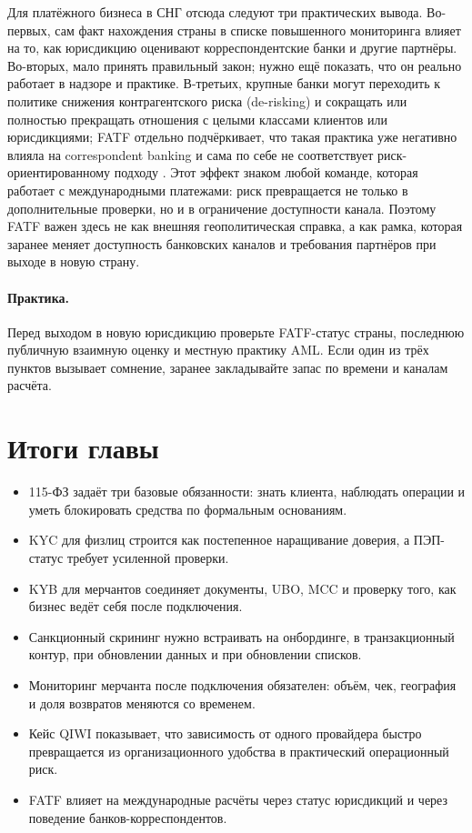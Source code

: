 Для платёжного бизнеса в СНГ отсюда следуют три практических вывода.
Во-первых, сам факт нахождения страны в списке повышенного
мониторинга влияет на то, как юрисдикцию оценивают корреспондентские
банки и другие партнёры. Во-вторых, мало принять правильный закон;
нужно ещё показать, что он реально работает в надзоре и практике.
В-третьих, крупные банки могут переходить к политике снижения
контрагентского риска (de-risking) и сокращать или полностью
прекращать отношения с целыми классами клиентов или юрисдикциями;
FATF отдельно подчёркивает, что такая практика уже негативно
влияла на correspondent banking и сама по себе не соответствует
риск-ориентированному подходу
\cite{fatf-correspondent-banking}\cite{fatf-increased-monitoring}.
Этот эффект знаком любой команде, которая работает с международными
платежами: риск превращается не только в дополнительные проверки,
но и в ограничение доступности канала. Поэтому FATF важен здесь не
как внешняя геополитическая справка, а как рамка, которая заранее
меняет доступность банковских каналов и требования партнёров при
выходе в новую страну.

\paragraph{Практика.}
Перед выходом в новую юрисдикцию проверьте FATF-статус страны, последнюю публичную взаимную оценку и местную практику AML. Если один из трёх пунктов вызывает сомнение, заранее закладывайте запас по времени и каналам расчёта.


\section*{Итоги главы}
\begin{itemize}
  \item 115-ФЗ задаёт три базовые обязанности: знать клиента,
        наблюдать операции и уметь блокировать средства по формальным
        основаниям.
  \item KYC для физлиц строится как постепенное наращивание доверия,
        а ПЭП-статус требует усиленной проверки.
  \item KYB для мерчантов соединяет документы, UBO, MCC и
        проверку того, как бизнес ведёт себя после подключения.
  \item Санкционный скрининг нужно встраивать на онбординге,
        в транзакционный контур, при обновлении данных и при обновлении списков.
  \item Мониторинг мерчанта после подключения обязателен: объём,
        чек, география и доля возвратов меняются со временем.
  \item Кейс QIWI показывает, что зависимость от одного провайдера
        быстро превращается из организационного удобства в
        практический операционный риск.
  \item FATF влияет на международные расчёты через статус
        юрисдикций и через поведение банков-корреспондентов.
\end{itemize}

